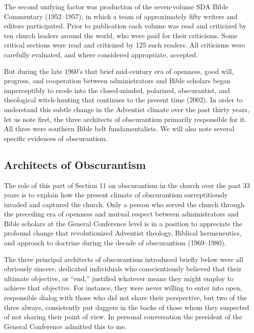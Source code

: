 The second unifying factor was production of the seven-volume SDA Bible
Commentary (1952--1957), in which a team of approximately 
fifty writers and editors participated. Prior to 
publication each volume was read and
criticized by ten church leaders around the world, who were paid for their
criticisms. Some 
critical sections were read and criticized by 125 such
readers. All criticisms were carefully evaluated, and where considered
appropriate, accepted.

But during the late 1960's that brief mid-century era of openness, good
will, progress, and cooperation between administrators and Bible scholars
began imperceptibly to erode into the closed-minded, polarized,
obscurantist, and theological witch-hunting that continues to the present
time (2002). In order to understand this subtle change in the Adventist
climate over the past thirty years, let us note first, the three architects
of obscurantism primarily responsible for it. All three were southern Bible
belt fundamentalists. We will also note several specific evidences of
obscurantism.

\subsection{Architects of Obscurantism}

The role of this part of Section 11 on obscurantism in the church over the
past 33 years is to explain how the present climate of obscurantism
surreptitiously invaded and captured the church. Only a person who served
the church through the preceding era of openness and mutual respect between
administrators and Bible scholars at the General Conference level is in a
position to appreciate the profound change that revolutionized Adventist
theology, Biblical hermeneutics, and approach to doctrine during the decade
of obscurantism (1969--1980).

The three principal architects of obscurantism introduced briefly below were
all obviously sincere, dedicated individuals who conscientiously believed
that their ultimate objective, or ``end,'' justified whatever means they might
employ to achieve that objective. For instance, they were never willing to
enter into open, responsible dialog with those who did not share their
perspective, but two of the three always, consistently put daggers in the
backs of those whom they suspected of not sharing their point of view. In
personal conversation the president of the General Conference admitted this
to me.

